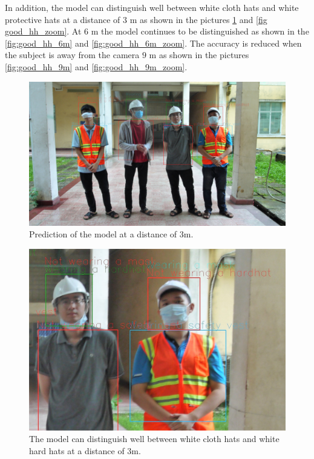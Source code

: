 \documentclass[conference]{IEEEtran}
\begin{document}
In addition, the model can distinguish well between white cloth hats and white protective hats at a distance of $ 3 $ m as shown in the pictures \ref{fig:good_hh} and \ref{fig good_hh_zoom}. At $ 6 $ m the model continues to be distinguished as shown in the \ref{fig:good_hh_6m} and \ref{fig:good_hh_6m_zoom}. The accuracy is reduced when the subject is away from the camera $ 9 $ m as shown in the pictures \ref{fig:good_hh_9m} and \ref {fig:good_hh_9m_zoom}.
\begin{figure}[ht]
	\centerline{\includegraphics[scale=0.08]{images/good_hh.jpg}}
  	\caption{Prediction of the model at a distance of 3m.}
  	\label{fig:good_hh}
\end{figure}
\begin{figure}[ht]
	\centerline{\includegraphics[scale=0.2]{images/good_hh_zoom.jpg}}
  	\caption{The model can distinguish well between white cloth hats and white hard hats at a distance of 3m.}
  	\label{fig:good_hh_zoom}
\end{figure}
\end{document}

